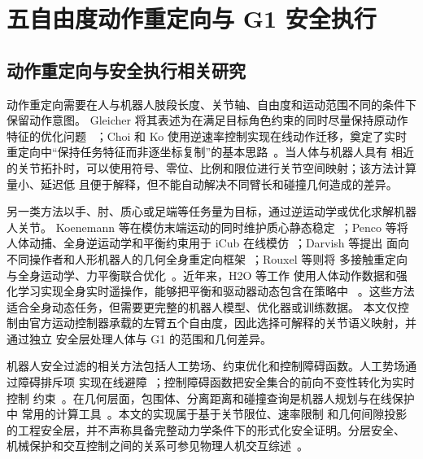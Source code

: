 
\chapter{五自由度动作重定向与 G1 安全执行}
\label{chap:g1_safe_retargeting_execution}

\section{动作重定向与安全执行相关研究}
\label{sec:ch5_related_work}

动作重定向需要在人与机器人肢段长度、关节轴、自由度和运动范围不同的条件下保留动作意图。
Gleicher 将其表述为在满足目标角色约束的同时尽量保持原动作特征的优化问题
~\cite{gleicher1998retargetting}；Choi 和 Ko 使用逆速率控制实现在线动作迁移，奠定了实时
重定向中“保持任务特征而非逐坐标复制”的基本思路~\cite{choi2000online}。当人体与机器人具有
相近的关节拓扑时，可以使用符号、零位、比例和限位进行关节空间映射；该方法计算量小、延迟低
且便于解释，但不能自动解决不同臂长和碰撞几何造成的差异。

另一类方法以手、肘、质心或足端等任务量为目标，通过逆运动学或优化求解机器人关节。
Koenemann 等在模仿末端运动的同时维护质心静态稳定~\cite{koenemann2014realtime}；Penco 等将
人体动捕、全身逆运动学和平衡约束用于 iCub 在线模仿~\cite{penco2018robust}；Darvish 等提出
面向不同操作者和人形机器人的几何全身重定向框架~\cite{darvish2019wholebody}；Rouxel 等则将
多接触重定向与全身运动学、力平衡联合优化~\cite{rouxel2022multicontact}。近年来，H2O 等工作
使用人体动作数据和强化学习实现全身实时遥操作，能够把平衡和驱动器动态包含在策略中
~\cite{he2024h2o}。这些方法适合全身动态任务，但需要更完整的机器人模型、优化器或训练数据。
本文仅控制由官方运动控制器承载的左臂五个自由度，因此选择可解释的关节语义映射，并通过独立
安全层处理人体与 G1 的范围和几何差异。

机器人安全过滤的相关方法包括人工势场、约束优化和控制障碍函数。人工势场通过障碍排斥项
实现在线避障~\cite{khatib1986realtime}；控制障碍函数把安全集合的前向不变性转化为实时控制
约束~\cite{ames2017cbf}。在几何层面，包围体、分离距离和碰撞查询是机器人规划与在线保护中
常用的计算工具~\cite{ericson2004realtime,pan2012fcl}。本文的实现属于基于关节限位、速率限制
和几何间隙投影的工程安全层，并不声称具备完整动力学条件下的形式化安全证明。分层安全、
机械保护和交互控制之间的关系可参见物理人机交互综述~\cite{haddadin2016physical}。

